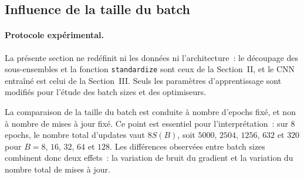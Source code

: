 \subsection{Influence de la taille du batch}
\paragraph{Protocole exp\'erimental.}
La pr\'esente section ne red\'efinit ni les donn\'ees ni l'architecture~: le d\'ecoupage des sous-ensembles et la fonction \texttt{standardize} sont ceux de la Section~II, et le CNN entra\^in\'e est celui de la Section~III. Seuls les param\`etres d'apprentissage sont modifi\'es pour l'\'etude des batch sizes et des optimiseurs.

\begin{table}[htbp]
\centering
\caption{Protocole exp\'erimental de la Section~4.}
\label{tab:section4_protocol}
\end{table}

La comparaison de la taille du batch est conduite \`a nombre d'epochs fix\'e, et non \`a nombre de mises \`a jour fix\'e. Ce point est essentiel pour l'interpr\'etation~: sur $8$ epochs, le nombre total d'updates vaut $8S(B)$, soit $5000$, $2504$, $1256$, $632$ et $320$ pour $B=8$, $16$, $32$, $64$ et $128$. Les diff\'erences observ\'ees entre batch sizes combinent donc deux effets~: la variation de bruit du gradient et la variation du nombre total de mises \`a jour.

